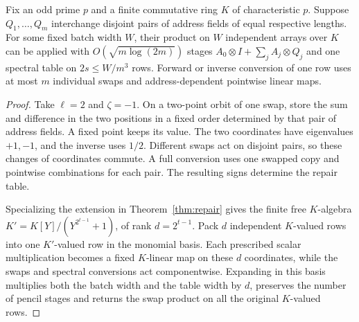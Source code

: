 \begin{corollary}
\label{cor:swap-repair}
Fix an odd prime \(p\) and a finite commutative ring \(K\) of
characteristic \(p\). Suppose \(Q_1,\ldots,Q_m\) interchange disjoint
pairs of address fields of equal respective lengths. For some fixed
batch width \(W\), their product on \(W\) independent arrays over \(K\)
can be applied with \(O(\sqrt{m\log(2m)})\) stages
\(A_0\otimes I+\sum_j A_j\otimes Q_j\) and one spectral table on
\(2s\le W/m^3\) rows. Forward or inverse conversion of one row uses
at most \(m\) individual swaps and address-dependent pointwise linear
maps.
\end{corollary}
\begin{proof}
Take \(\ell=2\) and \(\zeta=-1\). On a two-point orbit of one swap,
store the sum and difference in the two positions in a fixed order
determined by that pair of address fields. A fixed point keeps its
value. The two coordinates have eigenvalues \(+1,-1\), and the inverse
uses \(1/2\). Different swaps act on disjoint pairs, so these changes
of coordinates commute. A full conversion uses one swapped copy and
pointwise combinations for each pair. The resulting signs determine
the repair table.

Specializing the extension in Theorem~\ref{thm:repair} gives the finite
free \(K\)-algebra \(K'=K[Y]/(Y^{2^{t-1}}+1)\), of rank \(d=2^{t-1}\).
Pack \(d\) independent \(K\)-valued rows into one \(K'\)-valued row in
the monomial basis. Each prescribed scalar multiplication becomes a
fixed \(K\)-linear map on these \(d\) coordinates, while the swaps and
spectral conversions act componentwise. Expanding in this basis
multiplies both the batch width and the table width by \(d\), preserves
the number of pencil stages and returns the swap product on all the
original \(K\)-valued rows.
\end{proof}
